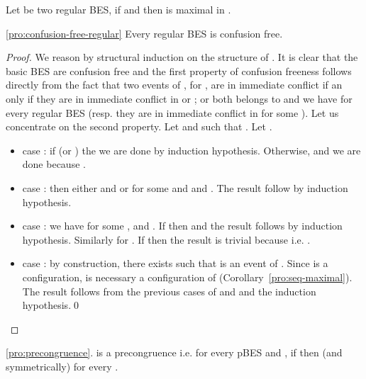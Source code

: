 \documentclass{llncs}
\newcommand{\<}{\langle}
\renewcommand{\>}{\rangle}
\begin{document}
\begin{corollary}\label{pro:seq-maximal}
Let  be two regular BES, if  and  then  is maximal in .
\end{corollary}

\begin{repproposition}{\ref{pro:confusion-free-regular}}
Every regular BES is confusion free.
\end{repproposition}

\begin{proof}
We reason by structural induction on the structure of . It is clear that the basic BES are confusion free and the first property of confusion freeness follows directly from the fact that two events of , for  , are in immediate conflict if an only if they are in immediate conflict in  or ; or both belongs to  and we have  for every regular BES (resp. they are in immediate conflict in  for some ). Let us concentrate on the second property. Let  and  such that . Let .
\begin{itemize}
\item case : if  (or ) the we are done by induction hypothesis. Otherwise,  and we are done because .
\item case : then either  and  or  for some  and  and . The result follow by induction hypothesis.
\item case : we have  for some ,  and . If  then  and the result follows by induction hypothesis. Similarly for . If  then the result is trivial because  i.e. .
\item case : by construction, there exists  such that  is an event of . Since  is a configuration,  is necessary a configuration of (Corollary~\ref{pro:seq-maximal}). The result follows from the previous cases of  and  and the induction hypothesis.\qed
\end{itemize}
\end{proof}

\begin{repproposition}{\ref{pro:precongruence}.}
 is a precongruence i.e. for every pBES  and , if  then  (and symmetrically) for every .
\end{repproposition}
\end{document}
